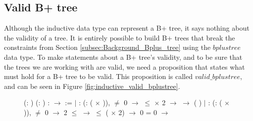\subsection{Valid B+ tree}
\label{subsec:Valid_bplustree}
Although the inductive data type can represent a B+ tree, it says nothing about the validity of a tree. It is entirely possible to build B+ trees that break the constraints from Section \ref{subsec:Background_Bplus_tree} using the $bplustree$ data type. To make statements about a B+ tree's validity, and to be sure that the trees we are working with are valid, we need a proposition that states what must hold for a B+ tree to be valid. This proposition is called $valid\_bplustree$, and can be seen in Figure \ref{fig:inductive_valid_bplustree}.

\begin{figure}
\centering
\begin{coqdoccode}
  (: ) (: ) :    \ensuremath{\rightarrow}  :=\coqdoceol
\coqdocindent{1.00em}
\ensuremath{|}   : \coqdockw{\ensuremath{\forall}} (:  ( \ensuremath{\times} )), \coqdoceol
\coqdocindent{11.00em}
 \ensuremath{\not=} 0 \ensuremath{\rightarrow}\coqdoceol
\coqdocindent{11.00em}
  \ensuremath{\le}  \ensuremath{\times} 2 \ensuremath{\rightarrow}\coqdoceol
\coqdocindent{11.00em}
  \ensuremath{\rightarrow}  \coqdoceol
\coqdocindent{11.00em}
   (   )\coqdoceol
\coqdocindent{1.00em}
\ensuremath{|}  : \coqdockw{\ensuremath{\forall}} (:  ( \ensuremath{\times}   )),\coqdoceol
\coqdocindent{11.00em}
 \ensuremath{\not=} 0 \ensuremath{\rightarrow} \coqdoceol
\coqdocindent{11.00em}
2 \ensuremath{\le}   \ensuremath{\rightarrow} \coqdoceol
\coqdocindent{11.00em}
  \ensuremath{\le}  ( \ensuremath{\times} 2) \ensuremath{\rightarrow}\coqdoceol
\coqdocindent{11.00em}
 0  =  0 \ensuremath{\rightarrow} \coqdoceol
\coqdocindent{11.00em}

\end{coqdoccode}
\end{figure}
